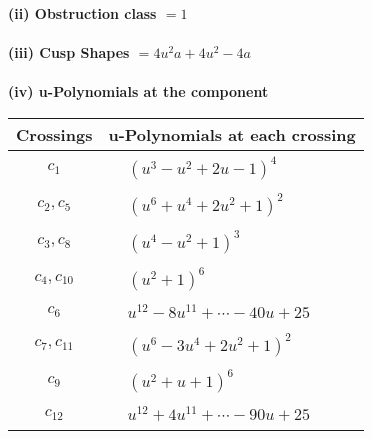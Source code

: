 \documentclass[1p]{elsarticle_modified}
\theoremstyle{definition}
\begin{document}
\flushleft \textbf{(ii) Obstruction class $= 1$}\\~\\
\flushleft \textbf{(iii) Cusp Shapes $= 4 u^2 a+4 u^2-4 a$}\\~\\
\newpage\renewcommand{\arraystretch}{1}
\flushleft \textbf{(iv) u-Polynomials at the component}\newline \\
\begin{tabular}{m{50pt}|m{274pt}}
Crossings & \hspace{64pt}u-Polynomials at each crossing \\
\hline $$\begin{aligned}c_{1}\end{aligned}$$&$\begin{aligned}
&(u^3- u^2+2 u-1)^4
\end{aligned}$\\
\hline $$\begin{aligned}c_{2},c_{5}\end{aligned}$$&$\begin{aligned}
&(u^6+u^4+2 u^2+1)^2
\end{aligned}$\\
\hline $$\begin{aligned}c_{3},c_{8}\end{aligned}$$&$\begin{aligned}
&(u^4- u^2+1)^3
\end{aligned}$\\
\hline $$\begin{aligned}c_{4},c_{10}\end{aligned}$$&$\begin{aligned}
&(u^2+1)^6
\end{aligned}$\\
\hline $$\begin{aligned}c_{6}\end{aligned}$$&$\begin{aligned}
&u^{12}-8 u^{11}+\cdots-40 u+25
\end{aligned}$\\
\hline $$\begin{aligned}c_{7},c_{11}\end{aligned}$$&$\begin{aligned}
&(u^6-3 u^4+2 u^2+1)^2
\end{aligned}$\\
\hline $$\begin{aligned}c_{9}\end{aligned}$$&$\begin{aligned}
&(u^2+u+1)^6
\end{aligned}$\\
\hline $$\begin{aligned}c_{12}\end{aligned}$$&$\begin{aligned}
&u^{12}+4 u^{11}+\cdots-90 u+25
\end{aligned}$\\
\hline
\end{tabular}\\~\\
\end{document}
